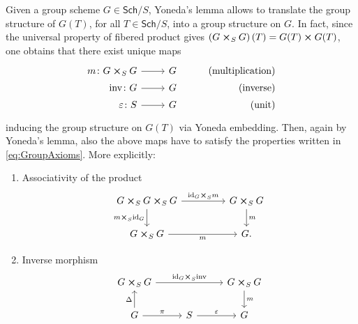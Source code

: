 \begin{rem}[]\label{rem:StructuralMorphisms}
	Given a group scheme $G \in \mathsf{Sch}/S$, Yoneda's lemma allows to translate
	the group structure of $G(T)$, for all $T \in \mathsf{Sch}/S$, into a group structure on $G$.
	In fact, since the universal property of
	fibered product gives $\left( G \cross_{ S } G \right)(T) = G(T) \cross G(T)$,
	one obtains that there exist unique maps
	\begin{equation*}
			\begin{tikzcd}[row sep = 0ex
         ,/tikz/column 1/.append style={anchor=base east}
         ,/tikz/column 2/.append style={anchor=base west}
         ,/tikz/column 3/.append style={anchor=base east}]
			m\colon G \cross_{ S } G \arrow[r, "", rightarrow] &
			G & \text{(multiplication)} \\
			\phantom{\cross_S} \mathrm{inv}\colon G \arrow[r, "", rightarrow] &
			G & \text{(inverse)} \\
			\varepsilon \colon S \arrow[r, "", rightarrow] &
			G & \text{(unit)} 
		\end{tikzcd}
	\end{equation*} 
	inducing the group structure on $G(T)$ via Yoneda embedding.
	Then, again by Yoneda's lemma, also the above maps have to
	satisfy the properties written in 
	\cref{eq:GroupAxioms}.
	More explicitly:
	\begin{enumerate}
		\item Associativity of the product
			\begin{equation*}
			\begin{tikzcd}[column sep=4.5em]
				G \cross_{ S } G \cross_{ S } G 
				\arrow[r, "\mathrm{id}_{ G } \cross_S m", rightarrow] 
				\arrow[d, "m \cross_S \mathrm{id}_{ G }"', rightarrow] &
				G \cross_{ S } G \arrow[d, "m", rightarrow] \\
				G \cross_{ S } G \arrow[r, "m"', rightarrow] &
				G.
			\end{tikzcd}
			\end{equation*} 
		\item Inverse morphism 
			\begin{equation*}
			\begin{tikzcd}[column sep=2.7em]
				G \cross_{ S } G
				\arrow[rr, "\mathrm{id}_{ G } \cross_S \mathrm{inv}", rightarrow] & &
				G \cross_{ S } G \arrow[d, "m", rightarrow] \\
				G \arrow[u, "\Delta", rightarrow] 
				\arrow[r, "\pi", rightarrow] &
				S \arrow[r, "\varepsilon", rightarrow] & 
				G
			\end{tikzcd}

\end{equation*}
\end{enumerate}
\end{rem}
